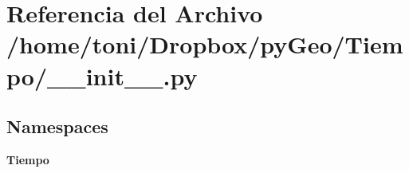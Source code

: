 \section{Referencia del Archivo /home/toni/\-Dropbox/py\-Geo/\-Tiempo/\-\_\-\-\_\-init\-\_\-\-\_\-.py}
\label{Tiempo_2____init_____8py}
\subsection*{Namespaces}
\begin{DoxyCompactItemize}
\item 
{\bf Tiempo}
\end{DoxyCompactItemize}
